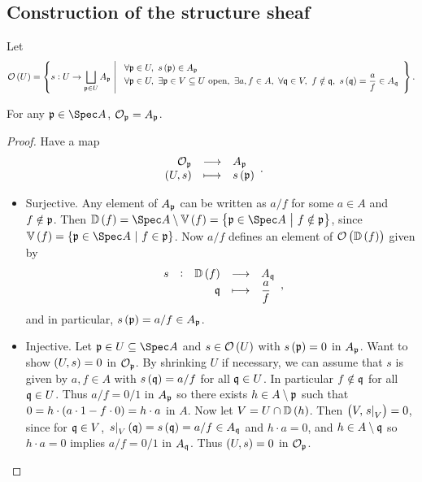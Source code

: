\subsection{Construction of the structure sheaf}

Let
$$ \OOO\br{U} = \cbr{s : U \to \bigsqcup_{\ppp \in U} A_\ppp \st \begin{array}{l} \forall \ppp \in U, \ s\br{\ppp} \in A_\ppp \\ \forall \ppp \in U, \ \exists \ppp \in V \subseteq U \ \text{open}, \ \exists a, f \in A, \ \forall \qqq \in V, \ f \notin \qqq, \ s\br{\qqq} = \dfrac{a}{f} \in A_\qqq \end{array}}. $$

\begin{proposition}
For any $ \ppp \in \Spec A $, $ \mathcal{O}_{\mathfrak{p}} = A_{\mathfrak{p}} $.
\end{proposition}

\begin{proof}
Have a map
$$ \function{\OOO_\ppp}{A_\ppp}{\br{U, s}}{s\br{\ppp}}. $$
\begin{itemize}
\item Surjective. Any element of $ A_{\mathfrak{p}} $ can be written as $ a / f $ for some $ a \in A $ and $ f \notin \mathfrak{p} $. Then $ \DD\br{f} = \Spec A \setminus \VV\br{f} = \cbr{\ppp \in \Spec A \st f \notin \ppp} $, since $ \VV\br{f} = \cbr{\ppp \in \Spec A \st f \in \ppp} $. Now $ a / f $ defines an element of $ \OOO\br{\DD\br{f}} $ given by
$$ \function[s]{\DD\br{f}}{A_\qqq}{\qqq}{\dfrac{a}{f}}, $$
and in particular, $ s\br{\ppp} = a / f \in A_\ppp $.
\item Injective. Let $ \ppp \in U \subseteq \Spec A $ and $ s \in \OOO\br{U} $ with $ s\br{\ppp} = 0 $ in $ A_{\mathfrak{p}} $. Want to show $ \br{U, s} = 0 $ in $ \mathcal{O}_{\mathfrak{p}} $. By shrinking $ U $ if necessary, we can assume that $ s $ is given by $ a, f \in A $ with $ s\br{\qqq} = a / f $ for all $ \mathfrak{q} \in U $. In particular $ f \notin \mathfrak{q} $ for all $ \mathfrak{q} \in U $. Thus $ a / f = 0 / 1 $ in $ A_{\mathfrak{p}} $ so there exists $ h \in A \setminus \mathfrak{p} $ such that $ 0 = h \cdot \br{a \cdot 1 - f \cdot 0} = h \cdot a $ in $ A $. Now let $ V = U \cap \DD\br{h} $. Then $ \br{V, \eval{s}_V} = 0 $, since for $ \mathfrak{q} \in V $, $ \eval{s}_V\br{\qqq} = s\br{\qqq} = a / f \in A_\qqq $ and $ h \cdot a = 0 $, and $ h \in A \setminus \mathfrak{q} $ so $ h \cdot a = 0 $ implies $ a / f = 0 / 1 $ in $ A_{\mathfrak{q}} $. Thus $ \br{U, s} = 0 $ in $ \mathcal{O}_{\mathfrak{p}} $.
\end{itemize}
\end{proof}


